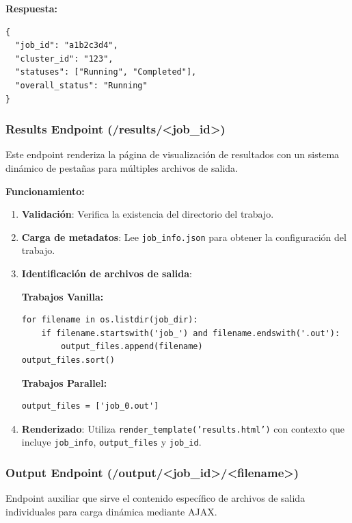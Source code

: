 \textbf{Respuesta:}

\begin{verbatim}
{
  "job_id": "a1b2c3d4",
  "cluster_id": "123", 
  "statuses": ["Running", "Completed"],
  "overall_status": "Running"
}
\end{verbatim}

\subsubsection{Results Endpoint (/results/<job\_id>)}
\noindent

Este endpoint renderiza la página de visualización de resultados con un sistema dinámico de pestañas para múltiples archivos de salida.

\textbf{Funcionamiento:}

\begin{enumerate}
	\item \textbf{Validación}: Verifica la existencia del directorio del trabajo.

	\item \textbf{Carga de metadatos}: Lee \texttt{job\_info.json} para obtener la configuración del trabajo.

	\item \textbf{Identificación de archivos de salida}:

	      \textbf{Trabajos Vanilla:}
	      \begin{verbatim}
for filename in os.listdir(job_dir):
    if filename.startswith('job_') and filename.endswith('.out'):
        output_files.append(filename)
output_files.sort()
	      \end{verbatim}

	      \textbf{Trabajos Parallel:}
	      \begin{verbatim}
output_files = ['job_0.out']
	      \end{verbatim}

	\item \textbf{Renderizado}: Utiliza \texttt{render\_template('results.html')} con contexto que incluye \texttt{job\_info}, \texttt{output\_files} y \texttt{job\_id}.
\end{enumerate}

\subsubsection{Output Endpoint (/output/<job\_id>/<filename>)}
\noindent

Endpoint auxiliar que sirve el contenido específico de archivos de salida individuales para carga dinámica mediante AJAX.

